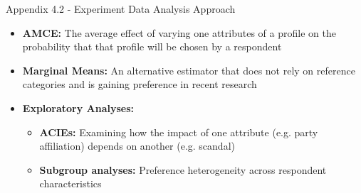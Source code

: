 \documentclass[9pt, aspectratio=169]{beamer}
\newcommand{\customcite}[1]{\textcolor{blue}{\footnotesize\parencite{#1}}}
\begin{document}
\begin{frame}{Appendix 4.2 - Experiment Data Analysis Approach}
    \begin{itemize}
\item \textbf{AMCE:} The average effect of varying one attributes of a profile on the probability that that profile will be chosen by a respondent \customcite{BansakEtAl2022}\vspace{0.3cm} 
\item \textbf{Marginal Means:} An alternative estimator that does not rely on reference categories and is gaining preference in recent research \customcite{Casiraghi} \vspace{0.3cm} 
        \item \textbf{Exploratory Analyses:}  
        \begin{itemize}
            \item \textbf{ACIEs:} Examining how the impact of one attribute (e.g. party affiliation) depends on another (e.g. scandal) \vspace{0.2cm}  
            \item \textbf{Subgroup analyses:} Preference heterogeneity across respondent characteristics \customcite{Leeper_Hobolt_Tilley_2020} \vspace{0.2cm} 
        \end{itemize}
    \end{itemize}
\end{frame}
\end{document}
